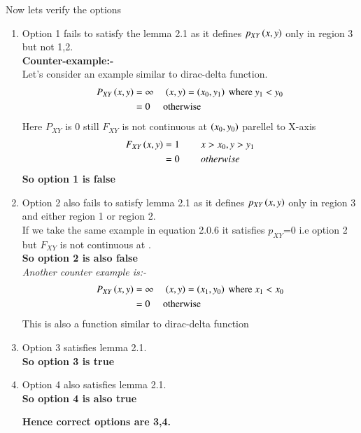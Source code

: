 \documentclass[journal,12pt,twocolumn]{IEEEtran}
\begin{document}
Now lets verify the options
\begin{enumerate}
\item Option 1 fails to satisfy the lemma 2.1 as it defines $p_{XY}\left(x,y\right)$ only in region 3 but not 1,2.\\
\textbf{Counter-example:-}\\
Let's consider an example similar to dirac-delta function.
\begin{align}
P_{XY}\left(x,y\right)&=\infty \hspace{0.15in} \left(x,y\right)=\left(x_0,y_1\right)\text{ where }y_1<y_0  \nonumber \\
&=0 \hspace{0.15in} \text{ otherwise}
\end{align}
Here $P_{XY}$ is 0 still $F_{XY}$ is not continuous at $\left(x_0,y_0\right)$ parellel to X-axis
\begin{align}
F_{XY}\left(x,y\right)&=1 \hspace{0.3in} x>x_0,y>y_1 \nonumber\\
&=0 \hspace{0.3in} otherwise
\end{align}
\textbf{So option 1 is false}
\item Option 2 also fails to satisfy lemma 2.1 as it defines $p_{XY}\left(x,y\right)$ only in region 3 and either region 1 or region 2.\\
If we take the same example in equation 2.0.6 it satisfies $p_{XY}$=0 i.e option 2 but $F_{XY}$ is not continuous at .\\
\textbf{So option 2 is also false}\\
\textit{Another counter example is:-}
\begin{align}
P_{XY}\left(x,y\right)&=\infty \hspace{0.15in} \left(x,y\right)=\left(x_1,y_0\right)\text{ where }x_1<x_0  \nonumber \\
&=0 \hspace{0.15in} \text{ otherwise}
\end{align}
This is also a function similar to dirac-delta function
\item Option 3 satisfies lemma 2.1.\\
\textbf{So option 3 is true}
\item Option 4 also satisfies lemma 2.1.\\
\textbf{So option 4 is also true}
\begin{center}
\textbf{Hence correct options are 3,4.}
\end{center}
\end{enumerate}
\end{document}
